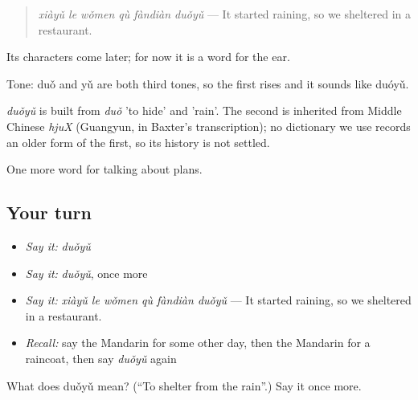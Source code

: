 \begin{quote}
\emph{xiàyǔ le wǒmen qù fàndiàn duǒyǔ} — It started raining, so we sheltered in a restaurant.
\end{quote}

Its characters come later; for now it is a word for the ear.

Tone: duǒ and yǔ are both third tones, so the first rises and it sounds like duóyǔ.

\begin{cousinweb}
\emph{duǒyǔ} is built from \emph{duǒ} 'to hide' and  'rain'. The second is inherited from Middle Chinese \emph{hjuX} (Guangyun, in Baxter's transcription); no dictionary we use records an older form of the first, so its history is not settled.
\end{cousinweb}

\begin{grammarlens}[title={What you've built}]
One more word for talking about plans.
\end{grammarlens}

\subsection*{Your turn}
\begin{itemize}
\raggedright
  \item \emph{Say it:} \emph{duǒyǔ}
  \item \emph{Say it:} \emph{duǒyǔ}, once more
  \item \emph{Say it:} \emph{xiàyǔ le wǒmen qù fàndiàn duǒyǔ} — It started raining, so we sheltered in a restaurant.
  \item \emph{Recall:} say the Mandarin for some other day, then the Mandarin for a raincoat, then say \emph{duǒyǔ} again
\end{itemize}

\begin{tcolorbox}[breakable,colback=teal!4,colframe=teal!35!black,title={Before you move on}]
What does duǒyǔ mean? (\textquotedblleft{}To shelter from the rain\textquotedblright{}.) Say it once more.
\end{tcolorbox}
